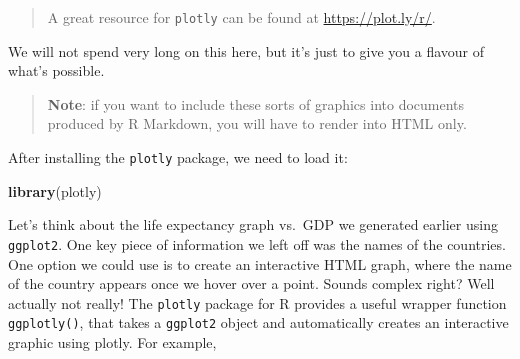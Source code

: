 \documentclass[]{book}
\newenvironment{Shaded}{\begin{snugshade}}{\end{snugshade}}
\newcommand{\KeywordTok}[1]{\textcolor[rgb]{0.13,0.29,0.53}{\textbf{{#1}}}}
\newcommand{\DataTypeTok}[1]{\textcolor[rgb]{0.13,0.29,0.53}{{#1}}}
\newcommand{\DecValTok}[1]{\textcolor[rgb]{0.00,0.00,0.81}{{#1}}}
\newcommand{\StringTok}[1]{\textcolor[rgb]{0.31,0.60,0.02}{{#1}}}
\newcommand{\NormalTok}[1]{{#1}}
\theoremstyle{definition}
\theoremstyle{definition}
\theoremstyle{definition}
\theoremstyle{remark}
\begin{document}
\begin{quote}
A great resource for \texttt{plotly} can be found at
\url{https://plot.ly/r/}.
\end{quote}

We will not spend very long on this here, but it's just to give you a
flavour of what's possible.

\begin{quote}
\textbf{Note}: if you want to include these sorts of graphics into
documents produced by R Markdown, you will have to render into HTML
only.
\end{quote}

After installing the \texttt{plotly} package, we need to load it:

\begin{Shaded}
\begin{Highlighting}[]
\KeywordTok{library}\NormalTok{(plotly)}
\end{Highlighting}
\end{Shaded}

Let's think about the life expectancy graph vs.~GDP we generated earlier
using \texttt{ggplot2}. One key piece of information we left off was the
names of the countries. One option we could use is to create an
interactive HTML graph, where the name of the country appears once we
hover over a point. Sounds complex right? Well actually not really! The
\texttt{plotly} package for R provides a useful wrapper function
\texttt{ggplotly()}, that takes a \texttt{ggplot2} object and
automatically creates an interactive graphic using plotly. For example,

\begin{Shaded}
\end{Shaded}
\end{document}
